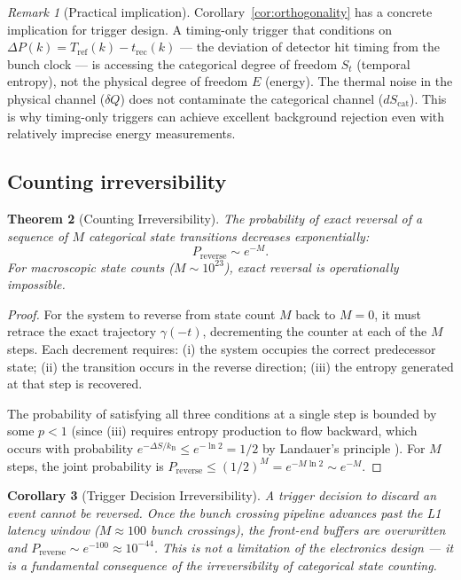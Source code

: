 \documentclass[twocolumn,10pt,a4paper]{article}
\theoremstyle{thmstyle}
\newtheorem{theorem}{Theorem}[section]
\newtheorem{corollary}[theorem]{Corollary}
\theoremstyle{definition}
\theoremstyle{remark}
\newtheorem{remark}[theorem]{Remark}
\newcommand{\kB}{k_{\mathrm{B}}}
\begin{document}
\begin{remark}[Practical implication]
Corollary~\ref{cor:orthogonality} has a concrete implication for trigger
design. A timing-only trigger that conditions on $\Delta P(k) = T_{\mathrm{ref}}(k)
- t_{\mathrm{rec}}(k)$ — the deviation of detector hit timing from the bunch
clock — is accessing the categorical degree of freedom $S_t$ (temporal entropy),
not the physical degree of freedom $E$ (energy). The thermal noise in the
physical channel ($\delta Q$) does not contaminate the categorical channel
($dS_{\mathrm{cat}}$). This is why timing-only triggers can achieve excellent
background rejection even with relatively imprecise energy measurements.
\end{remark}

\subsection{Counting irreversibility}

\begin{theorem}[Counting Irreversibility]
\label{thm:irreversibility}
The probability of exact reversal of a sequence of $M$ categorical state
transitions decreases exponentially:
\begin{equation}
P_{\mathrm{reverse}} \sim e^{-M}.
\label{eq:irreversibility}
\end{equation}
For macroscopic state counts ($M \sim 10^{23}$), exact reversal is
operationally impossible.
\end{theorem}

\begin{proof}
For the system to reverse from state count $M$ back to $M = 0$, it must
retrace the exact trajectory $\gamma(-t)$, decrementing the counter at
each of the $M$ steps. Each decrement requires: (i) the system occupies
the correct predecessor state; (ii) the transition occurs in the reverse
direction; (iii) the entropy generated at that step is recovered.

The probability of satisfying all three conditions at a single step is
bounded by some $p < 1$ (since (iii) requires entropy production to flow
backward, which occurs with probability $e^{-\Delta S/\kB} \leq e^{-\ln 2}
= 1/2$ by Landauer's principle \citep{landauer1961}). For $M$ steps, the joint
probability is $P_{\mathrm{reverse}} \leq (1/2)^M = e^{-M\ln 2} \sim e^{-M}$.
\end{proof}

\begin{corollary}[Trigger Decision Irreversibility]
\label{cor:trigger_irreversible}
A trigger decision to discard an event cannot be reversed. Once the
bunch crossing pipeline advances past the L1 latency window ($M \approx 100$
bunch crossings), the front-end buffers are overwritten and $P_{\mathrm{reverse}}
\sim e^{-100} \approx 10^{-44}$. This is not a limitation of the electronics
design — it is a fundamental consequence of the irreversibility of
categorical state counting.
\end{corollary}
\end{document}
